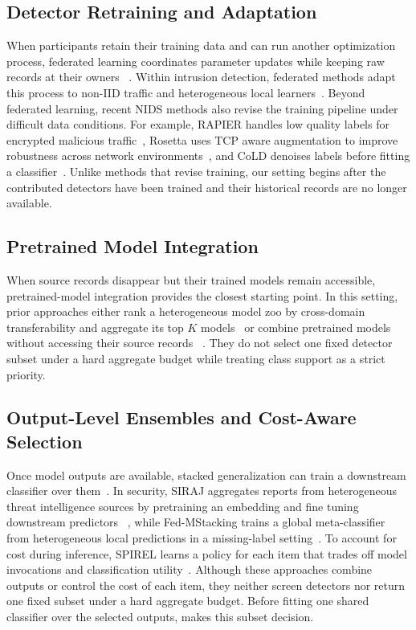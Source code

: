 \subsection{Detector Retraining and Adaptation}

When participants retain their training data and can run another
optimization process, federated learning coordinates parameter updates while
keeping raw records at their owners
~\cite{federated_learning,Fedprox,ditto2021}. Within intrusion detection,
federated methods adapt this process to non-IID traffic and heterogeneous
local learners~\cite{pourahmadi2023fedoe,xu2026entente}. Beyond federated
learning, recent NIDS methods also revise the training pipeline under difficult
data conditions. For example, RAPIER handles low quality labels for encrypted
malicious traffic~\cite{qing2024rapier}, Rosetta uses TCP aware augmentation to
improve robustness across network environments~\cite{xie2023rosetta}, and CoLD
denoises labels before fitting a classifier~\cite{yang2026cold}. Unlike methods
that revise training, our setting begins after the contributed detectors have
been trained and their historical records are no longer available.

\subsection{Pretrained Model Integration}

When source records disappear but their trained models remain accessible,
pretrained-model integration provides the closest starting point. In this
setting, prior approaches either rank a heterogeneous model zoo by cross-domain
transferability and aggregate its top $K$ models~\cite{dong2022zood} or combine
pretrained models without accessing their source records
~\cite{wei2024tgr,zhao2024modelglue}. They do not select one fixed detector
subset under a hard aggregate budget while treating class support as a strict
priority.

\subsection{Output-Level Ensembles and Cost-Aware Selection}

Once model outputs are available, stacked generalization can train a
downstream classifier over them~\cite{wolpert1992stacked}. In security, SIRAJ
aggregates reports from heterogeneous threat intelligence sources by
pretraining an embedding and fine tuning downstream predictors
~\cite{thirumuruganathan2022siraj}, while Fed-MStacking trains a global
meta-classifier from heterogeneous local predictions in a missing-label
setting~\cite{qiu2024fedmstacking}. To account for cost during inference,
SPIREL learns a policy for each item that trades off model invocations and
classification utility~\cite{birman2022spirel}. Although these approaches
combine outputs or control the cost of each item, they neither screen detectors
nor return one fixed subset under a hard aggregate budget. Before fitting one
shared classifier over the selected outputs, \Fname makes this subset decision.

